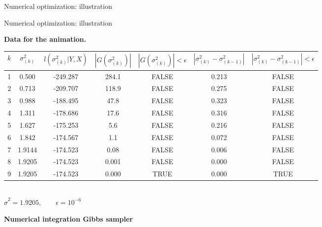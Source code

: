 \documentclass[notes,blackandwhite,mathsans]{beamer}
\begin{document}
{
\begin{frame}{Numerical optimization: illustration}
\end{frame}
}


\begin{frame}{Numerical optimization: illustration}

\textbf{Data for the animation.}\tiny
\begin{center}
\begin{tabular}{ccccccc}
\toprule
$k$ & $\sigma^2_{(k)}$ & $l(\sigma^2_{(k)}|Y,X)$ & $|G(\sigma^2_{(k)})|$ & $|G(\sigma^2_{(k)})|<\epsilon$ &  $|\sigma^2_{(k)}-\sigma^2_{(k-1)}|$ & $|\sigma^2_{(k)}-\sigma^2_{(k-1)}|<\epsilon$\\
\midrule
1&    0.500& -249.287& 284.1&     FALSE&           0.213&                 FALSE\\
2 &   0.713& -209.707& 118.9&     FALSE&           0.275&                 FALSE\\
3&    0.988& -188.495&  47.8&     FALSE&           0.323&                 FALSE\\
4&    1.311& -178.686&  17.6&     FALSE&           0.316&                 FALSE\\
5&    1.627& -175.253&   5.6&     FALSE&           0.216&                 FALSE\\
6&    1.842& -174.567&   1.1&     FALSE&           0.072&                 FALSE\\
7&    1.9144& -174.523&   0.08&     FALSE&           0.006&                 FALSE\\
8&    1.9205& -174.523&   0.001&     FALSE&           0.000&                 FALSE\\
9&    1.9205& -174.523&   0.000&     TRUE&           0.000&                 TRUE\\
\bottomrule
\end{tabular}\\
$ \hat\sigma^2 =  1.9205, \qquad \epsilon = 10^{-6}$
\end{center}

\end{frame}




{
\begin{frame}

\begin{adjustwidth}{-0.5cm}{0cm}
\vspace{8.3cm}\Large
\textbf{{\color{mcxs2}Numerical integration} {\color{mcxs5}Gibbs sampler}}
\end{adjustwidth}

\end{frame}
}
\end{document}
